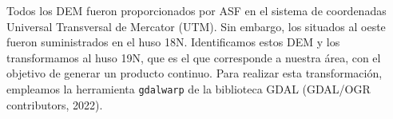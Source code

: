 \documentclass[spanish]{article}
\newenvironment{Shaded}{\begin{snugshade}}{\end{snugshade}}
\newcommand{\AttributeTok}[1]{\textcolor[rgb]{0.77,0.63,0.00}{#1}}
\newcommand{\ControlFlowTok}[1]{\textcolor[rgb]{0.13,0.29,0.53}{\textbf{#1}}}
\newcommand{\FunctionTok}[1]{\textcolor[rgb]{0.00,0.00,0.00}{#1}}
\newcommand{\NormalTok}[1]{#1}
\newcommand{\OtherTok}[1]{\textcolor[rgb]{0.56,0.35,0.01}{#1}}
\newcommand{\SpecialCharTok}[1]{\textcolor[rgb]{0.00,0.00,0.00}{#1}}
\newcommand{\StringTok}[1]{\textcolor[rgb]{0.31,0.60,0.02}{#1}}
\begin{document}
\begin{Shaded}
\end{Shaded}

Todos los DEM fueron proporcionados por ASF en el sistema de coordenadas
Universal Transversal de Mercator (UTM). Sin embargo, los situados al
oeste fueron suministrados en el huso 18N. Identificamos estos DEM y los
transformamos al huso 19N, que es el que corresponde a nuestra área, con
el objetivo de generar un producto continuo. Para realizar esta
transformación, empleamos la herramienta \texttt{gdalwarp} de la
biblioteca GDAL (GDAL/OGR contributors, 2022).
\end{document}
